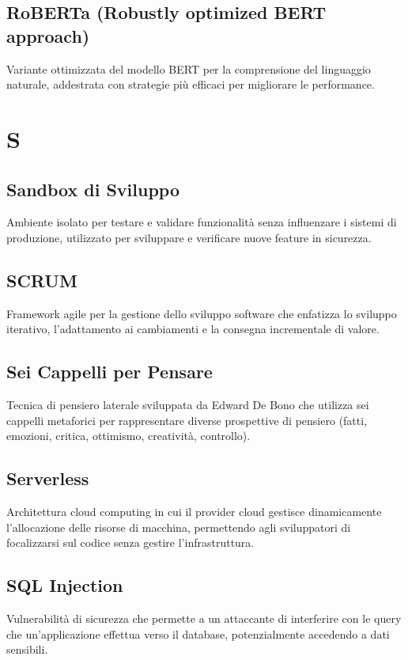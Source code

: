 \documentclass[a4paper,11pt]{article}
\begin{document}
\subsection{RoBERTa (Robustly optimized BERT approach)}
Variante ottimizzata del modello BERT per la comprensione del linguaggio naturale, addestrata con strategie più efficaci per migliorare le performance.

\newpage
\section{S}

\subsection{Sandbox di Sviluppo}
Ambiente isolato per testare e validare funzionalità senza influenzare i sistemi di produzione, utilizzato per sviluppare e verificare nuove feature in sicurezza.

\subsection{SCRUM}
Framework agile per la gestione dello sviluppo software che enfatizza lo sviluppo iterativo, l'adattamento ai cambiamenti e la consegna incrementale di valore.

\subsection{Sei Cappelli per Pensare}
Tecnica di pensiero laterale sviluppata da Edward De Bono che utilizza sei cappelli metaforici per rappresentare diverse prospettive di pensiero (fatti, emozioni, critica, ottimismo, creatività, controllo).

\subsection{Serverless}
Architettura cloud computing in cui il provider cloud gestisce dinamicamente l'allocazione delle risorse di macchina, permettendo agli sviluppatori di focalizzarsi sul codice senza gestire l'infrastruttura.

\subsection{SQL Injection}
Vulnerabilità di sicurezza che permette a un attaccante di interferire con le query che un'applicazione effettua verso il database, potenzialmente accedendo a dati sensibili.
\end{document}

